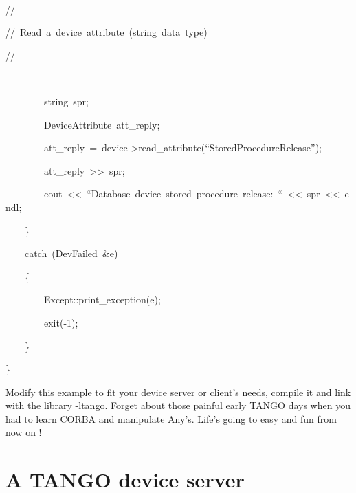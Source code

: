 \begin{lyxcode}
~

//

//~Read~a~device~attribute~(string~data~type)

//

~

~~~~~~~~string~spr;

~~~~~~~~DeviceAttribute~att\_reply;

~~~~~~~~att\_reply~=~device->read\_attribute(``StoredProcedureRelease'');

~~~~~~~~att\_reply~>\textcompwordmark{}>~spr;

~~~~~~~~cout~<\textcompwordmark{}<~``Database~device~stored~procedure~release:~``~<\textcompwordmark{}<~spr~<\textcompwordmark{}<~endl;

~~~~\}

\noindent ~~~~catch~(DevFailed~\&e)

\noindent ~~~~\{

\noindent ~~~~~~~~Except::print\_exception(e);

\noindent ~~~~~~~~exit(-1);

\noindent ~~~~\}~

\noindent \}
\end{lyxcode}


\noindent Modify this example to fit your device server or client's
needs, compile it and link with the library -ltango. Forget about
those painful early TANGO days when you had to learn CORBA and manipulate
Any's. Life's going to easy and fun from now on !


\section{A TANGO device server}

